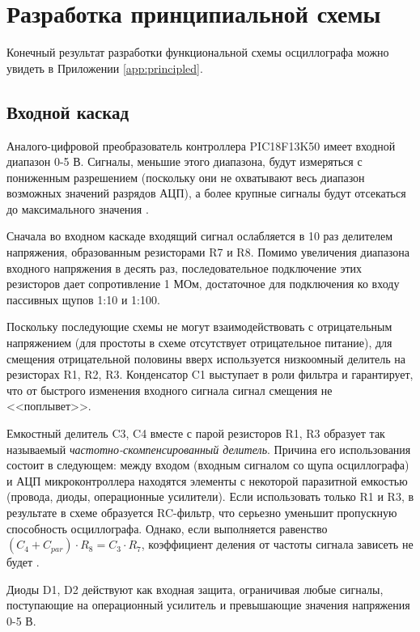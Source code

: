 \section{Разработка принципиальной схемы}

Конечный результат разработки функциональной схемы осциллографа можно увидеть в Приложении \ref{app:principled}.

\subsection{Входной каскад}

Аналого-цифровой преобразователь контроллера PIC18F13K50 имеет входной диапазон 0-5 В.
Сигналы, меньшие этого диапазона, будут измеряться с пониженным разрешением (поскольку они не охватывают весь диапазон возможных значений разрядов АЦП), а более крупные сигналы будут отсекаться до максимального значения \cite{pic18f13k50}.

Сначала во входном каскаде входящий сигнал ослабляется в 10 раз делителем напряжения, образованным резисторами R7 и R8. Помимо увеличения диапазона входного напряжения в десять раз, последовательное подключение этих резисторов дает сопротивление 1 МОм, достаточное для подключения ко входу пассивных щупов 1:10 и 1:100.

Поскольку последующие схемы не могут взаимодействовать с отрицательным напряжением (для простоты в схеме отсутствует отрицательное питание), для смещения отрицательной половины вверх используется низкоомный делитель на резисторах R1, R2, R3. Конденсатор C1 выступает в роли фильтра и гарантирует, что от быстрого изменения входного сигнала сигнал смещения не <<поплывет>>.

Емкостный делитель C3, C4 вместе с парой резисторов R1, R3 образует так называемый \emph{частотно-скомпенсированный делитель}. 
Причина его использования состоит в следующем: между входом (входным сигналом со щупа осциллографа) и АЦП микроконтроллера находятся элементы с некоторой паразитной емкостью (провода, диоды, операционные усилители). Если использовать только R1 и R3, в результате в схеме образуется RC-фильтр, что серьезно уменьшит пропускную способность осциллографа.
Однако, если выполняется равенство $(C_4 + C_{par})\cdot R_8 = C_3 \cdot R_7$, коэффициент деления от частоты сигнала зависеть не будет \cite{fcd}.

Диоды D1, D2 действуют как входная защита, ограничивая любые сигналы, поступающие на операционный усилитель и превышающие значения напряжения 0-5 В.


